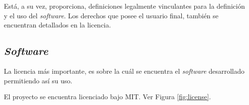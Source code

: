 Está, a su vez, proporciona, definiciones legalmente vinculantes para la definición y el uso del \textit{software}. Los derechos que posee el usuario final, también se encuentran detallados en la licencia.

\subsection{\textit{Software}}
La licencia más importante, es sobre la cuál se encuentra el \textit{software} desarrollado permitiendo así su uso.

El proyecto se encuentra licenciado bajo MIT. Ver Figura \ref{fig:license}.
